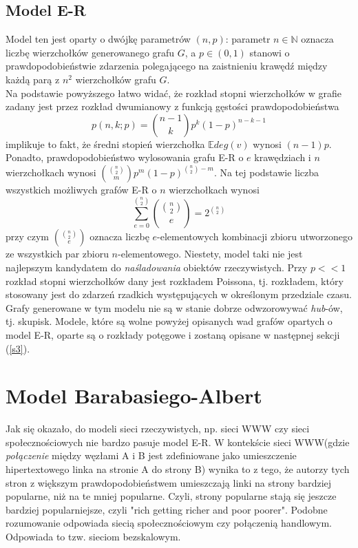 \documentclass{article}
\begin{document}
\subsection{Model E-R}
	Model ten jest oparty o dwójkę parametrów $(n, p)$: parametr $n \in \mathbb{N}$ oznacza liczbę wierzchołków generowanego grafu $G$, a $p \in
	(0, 1)$ stanowi o prawdopodobieństwie zdarzenia polegającego na zaistnieniu krawędź między każdą parą z $n^2$ wierzchołków grafu $G$. \\
	Na podstawie powyższego łatwo widać, że rozkład stopni wierzchołków w grafie zadany jest przez rozkład dwumianowy z funkcją
	gęstości prawdopodobieństwa 
	\begin{equation}
		p(n,k; p) = \binom{n-1}{k}p^{k}(1-p)^{n-k - 1}
	\end{equation}
	implikuje to fakt, że średni stopień wierzchołka $\mathbb{E}deg(v)$ wynosi $(n-1)p$. Ponadto, prawdopodobieństwo wylosowania grafu E-R o $e$ krawędziach i $n$ wierzchołkach wynosi
	$\binom{\binom{n}{2}}{m}p^{m}(1-p)^{\binom{n}{2} - m}$. Na tej podstawie liczba wszystkich możliwych grafów E-R o $n$ wierzchołkach wynosi
	\begin{equation}
		\sum_{e = 0}^{\binom{n}{2}} \binom{\binom{n}{2}}{e} = 2^{\binom{n}{2}}
	\end{equation}
	przy czym $\binom{\binom{n}{2}}{e}$ oznacza liczbę $e$-elementowych kombinacji zbioru utworzonego ze wszystkich par zbioru $n$-elementowego. \newline
	Niestety, model taki nie jest najlepszym kandydatem do \textit{naśladowania} obiektów rzeczywistych. Przy $p << 1$ rozkład stopni wierzchołków dany jest rozkładem Poissona, tj. rozkładem, który stosowany jest do zdarzeń rzadkich występujących w określonym przedziale czasu. Grafy generowane w tym modelu nie są w stanie dobrze odwzorowywać \textit{hub}-ów, tj. skupisk. \newline
	Modele, które są wolne powyżej opisanych wad grafów opartych o model E-R, oparte są o rozkłady potęgowe i zostaną opisane w następnej sekcji (\ref{s3}).
\section{Model Barabasiego-Albert \label{s4}}
	Jak się okazało, do modeli sieci rzeczywistych, np. sieci WWW czy sieci społecznościowych nie bardzo pasuje model E-R. W kontekście sieci WWW(gdzie \textit{połączenie} między węzłami A i B jest zdefiniowane jako umieszczenie hipertextowego linka na stronie A do strony B) wynika to z tego, że autorzy tych stron z większym prawdopodobieństwem umieszczają linki na strony bardziej popularne, niż na te mniej popularne. Czyli, strony popularne stają się jeszcze bardziej popularniejsze, czyli "rich getting richer and poor poorer". Podobne rozumowanie odpowiada siecią społecznościowym czy połączenią handlowym. Odpowiada to tzw. sieciom bezskalowym.\cite{Fronczak2}
\end{document}
